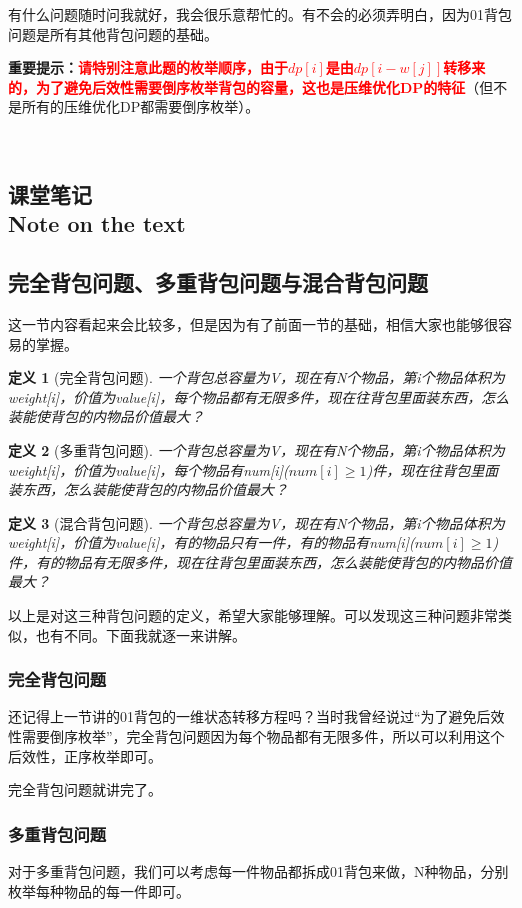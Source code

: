\documentclass{article}
\newtheorem{definition}{定义}[subsection]
\theoremstyle{nonumberplain}
\newcommand{\note}{\ \par
	\subsection*{课堂笔记\\\tiny{Note on the text}}
	\newpage}
\begin{document}
有什么问题随时问我就好，我会很乐意帮忙的。有不会的必须弄明白，因为01背包问题是所有其他背包问题的基础。

\textbf{重要提示：}\textcolor{red}{\textbf{请特别注意此题的枚举顺序，由于$dp[i]$是由$dp[i-w[j]]$转移来的，为了避免后效性需要倒序枚举背包的容量，这也是压维优化DP的特征}}（但不是所有的压维优化DP都需要倒序枚举）。

\note


\subsection{完全背包问题、多重背包问题与混合背包问题}
这一节内容看起来会比较多，但是因为有了前面一节的基础，相信大家也能够很容易的掌握。

\begin{definition}[完全背包问题]一个背包总容量为V，现在有N个物品，第i个物品体积为weight[i]，价值为value[i]，每个物品都有无限多件，现在往背包里面装东西，怎么装能使背包的内物品价值最大？\end{definition}

\begin{definition}[多重背包问题]一个背包总容量为V，现在有N个物品，第i个物品体积为weight[i]，价值为value[i]，每个物品有num[i]($num[i]\geq 1$)件，现在往背包里面装东西，怎么装能使背包的内物品价值最大？\end{definition}

\begin{definition}[混合背包问题]一个背包总容量为V，现在有N个物品，第i个物品体积为weight[i]，价值为value[i]，有的物品只有一件，有的物品有num[i]($num[i]\geq 1$)件，有的物品有无限多件，现在往背包里面装东西，怎么装能使背包的内物品价值最大？\end{definition}

以上是对这三种背包问题的定义，希望大家能够理解。可以发现这三种问题非常类似，也有不同。下面我就逐一来讲解。

\subsubsection{完全背包问题}

还记得上一节讲的01背包的一维状态转移方程吗？当时我曾经说过“为了避免后效性需要倒序枚举”，完全背包问题因为每个物品都有无限多件，所以可以利用这个后效性，正序枚举即可。

完全背包问题就讲完了。

\subsubsection{多重背包问题}
对于多重背包问题，我们可以考虑每一件物品都拆成01背包来做，N种物品，分别枚举每种物品的每一件即可。
\end{document}
